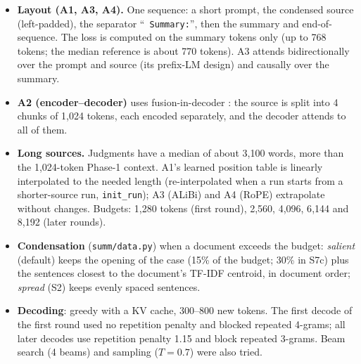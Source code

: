 \documentclass[11pt,a4paper]{article}
\newcommand{\code}[1]{\texttt{\small #1}}
\begin{document}
\begin{itemize}
  \item \textbf{Layout (A1, A3, A4).}  One sequence: a short prompt, the condensed source (left-padded), the
  separator ``\code{ Summary:}'', then the summary and end-of-sequence.  The loss is computed on the summary
  tokens only (up to 768 tokens; the median reference is about 770 tokens).  A3 attends bidirectionally over the
  prompt and source (its prefix-LM design) and causally over the summary.
  \item \textbf{A2 (encoder--decoder)} uses fusion-in-decoder \cite{izacard2021fid}: the source is split into
  4 chunks of 1{,}024 tokens, each encoded separately, and the decoder attends to all of them.
  \item \textbf{Long sources.}  Judgments have a median of about 3{,}100 words, more than the 1{,}024-token
  Phase-1 context.  A1's learned position table is linearly interpolated to the needed length
  \cite{chen2023pi} (re-interpolated when a run starts from a shorter-source run, \code{init\_run}); A3 (ALiBi)
  and A4 (RoPE) extrapolate without changes.  Budgets: 1{,}280 tokens (first round), 2{,}560, 4{,}096, 6{,}144
  and 8{,}192 (later rounds).
  \item \textbf{Condensation} (\code{summ/data.py}) when a document exceeds the budget: \emph{salient}
  (default) keeps the opening of the case (15\% of the budget; 30\% in S7c) plus the sentences closest to the
  document's TF-IDF centroid, in document order; \emph{spread} (S2) keeps evenly spaced sentences.
  \item \textbf{Decoding}: greedy with a KV cache, 300--800 new tokens.  The first decode of the first round
  used no repetition penalty and blocked repeated 4-grams; all later decodes use repetition penalty 1.15
  \cite{keskar2019ctrl} and block repeated 3-grams.  Beam search (4 beams) and sampling ($T=0.7$) were also
  tried.
\end{itemize}
\end{document}

